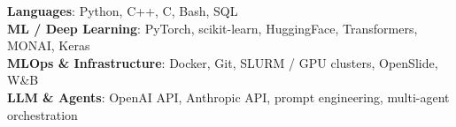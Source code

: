 
\newcommand{\skillpoint}[2]{
    \noindent
    {\color{black}\fontsize{10pt}{1em}\bfseries{#1}}:
    {\color{black}\small{#2}}\\
}
\skillpoint{Languages}{Python, C++, C, Bash, SQL}
\skillpoint{ML / Deep Learning}{PyTorch, scikit-learn, HuggingFace, Transformers, MONAI, Keras}
\skillpoint{MLOps \& Infrastructure}{Docker, Git, SLURM / GPU clusters, OpenSlide, W\&B}
\skillpoint{LLM \& Agents}{OpenAI API, Anthropic API, prompt engineering, multi-agent orchestration}

\vspace{-2mm}
